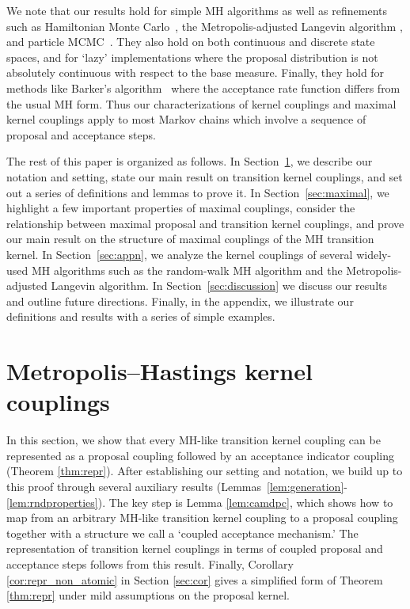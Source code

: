 \documentclass[aihp]{imsart}
\theoremstyle{plain}
\theoremstyle{remark}
\theoremstyle{definition} \newtheorem{example}{Example}
\begin{document}
We note that our results hold for simple MH algorithms as well as refinements such as Hamiltonian
Monte Carlo~\citep{Duane:1987, Neal1993, neal2011mcmc}, the Metropolis-adjusted Langevin algorithm
\citep{roberts1996exponential}, and particle MCMC~\citep{andrieu:doucet:holenstein:2010}. They also
hold on both continuous and discrete state spaces, and for `lazy' implementations where the proposal
distribution is not absolutely continuous with respect to the base measure. Finally, they hold for
methods like Barker's algorithm~\citep{Barker1965} where the acceptance rate function differs from
the usual MH form. Thus our characterizations of kernel couplings and maximal kernel couplings apply
to most Markov chains which involve a sequence of proposal and acceptance steps.

The rest of this paper is organized as follows. In Section~\ref{sec:kercoup}, we describe our
notation and setting, state our main result on transition kernel couplings, and set out a series of
definitions and lemmas to prove it. In Section~\ref{sec:maximal}, we highlight a few important
properties of maximal couplings, consider the relationship between maximal proposal and transition
kernel couplings, and prove our main result on the structure of maximal couplings of the MH
transition kernel. In Section~\ref{sec:appn}, we analyze the kernel couplings of several widely-used
MH algorithms such as the random-walk MH algorithm and the Metropolis-adjusted Langevin algorithm.
In Section~\ref{sec:discussion} we discuss our results and outline future directions. Finally, in
the appendix, we illustrate our definitions and results with a series of simple examples.


\section{Metropolis--Hastings kernel couplings}
\label{sec:kercoup}

In this section, we show that every MH-like transition kernel coupling can be represented as a
proposal coupling followed by an acceptance indicator coupling (Theorem \ref{thm:repr}). After
establishing our setting and notation, we build up to this proof through several auxiliary results
(Lemmas~\ref{lem:generation}-\ref{lem:rndproperties}). The key step is Lemma \ref{lem:camdpc}, which
shows how to map from an arbitrary MH-like transition kernel coupling to a proposal coupling
together with a structure we call a `coupled acceptance mechanism.' The representation of transition
kernel couplings in terms of coupled proposal and acceptance steps follows from this result.
Finally, Corollary \ref{cor:repr_non_atomic} in Section \ref{sec:cor} gives a simplified form of
Theorem \ref{thm:repr} under mild assumptions on the proposal kernel.
\end{document}
